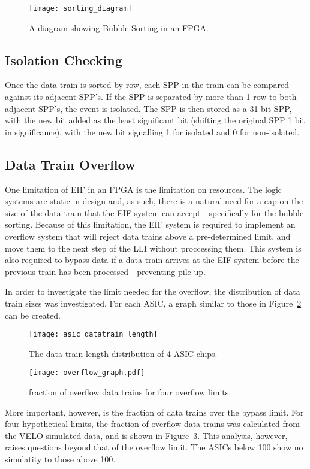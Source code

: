 		\begin{figure}[ht]
			\centering
			\texttt{[image: sorting\_diagram]}
			\caption{A diagram showing Bubble Sorting in an FPGA.}
			\label{fig:sorting}
		\end{figure}

	\subsection{Isolation Checking}

		Once the data train is sorted by row, each SPP in the train can be compared against its adjacent SPP's.
		If the SPP is separated by more than 1 row to both adjacent SPP's, the event is isolated.
		The SPP is then stored as a 31 bit SPP, with the new bit added as the least significant bit (shifting the original SPP 1 bit in significance), with the new bit signalling 1 for isolated and 0 for non-isolated. 

	\subsection{Data Train Overflow} %
	\label{sub:data_train_overflow}
		
		One limitation of EIF in an FPGA is the limitation on resources. 
		The logic systems are static in design and, as such, there is a natural need for a cap on the size of the data train that the EIF system can accept - specifically for the bubble sorting.
		Because of this limitation, the EIF system is required to implement an overflow system that will reject data trains above a pre-determined limit, and move them to the next step of the LLI without proccessing them.
		This system is also required to bypass data if a data train arrives at the EIF system before the previous train has been processed - preventing pile-up.
		\par
		In order to investigate the limit needed for the overflow, the distribution of data train sizes was investigated. For each ASIC, a graph similar to those in Figure~\ref{fig:asic_datatrain} can be created.

		\begin{figure}[h]
			\centering
			\texttt{[image: asic\_datatrain\_length]}
			\caption{The data train length distribution of 4 ASIC chips.}
			\label{fig:asic_datatrain}
		\end{figure}
		\par
		\begin{figure}[h]
			\centering
			\texttt{[image: overflow\_graph.pdf]}
			\caption{fraction of overflow data trains for four overflow limits.}
			\label{fig:overflow_franction}
		\end{figure}\FloatBarrier
		More important, however, is the fraction of data trains over the bypass limit.
		For four hypothetical limits, the fraction of overflow data trains was calculated from the VELO simulated data, and is shown in Figure~\ref{fig:overflow_franction}.
		This analysis, however, raises questions beyond that of the overflow limit.
		The ASICs below 100 show no simulatity to those above 100.

